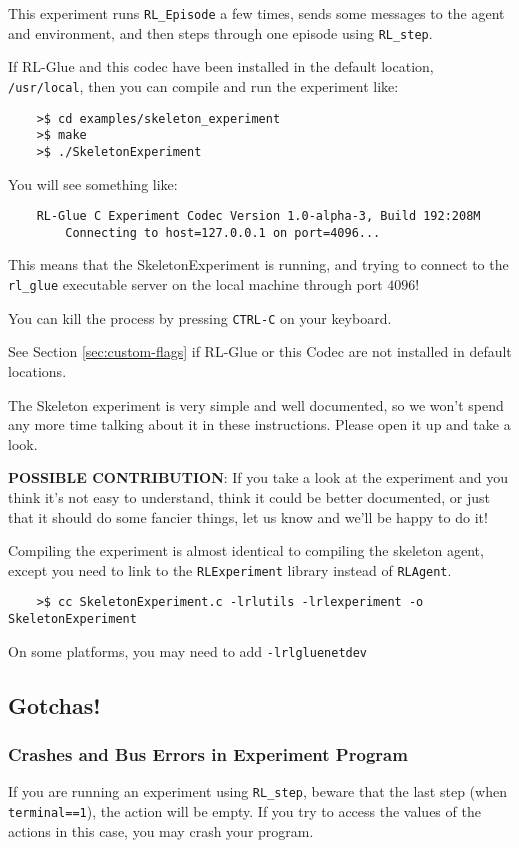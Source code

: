 \documentclass[11pt]{article}
\begin{document}
This experiment runs \texttt{RL\_Episode} a few times, sends some messages to the agent and environment, and then steps through one episode using \texttt{RL\_step}.

If RL-Glue and this codec have been installed in the default location, \texttt{/usr/local}, then you can compile and run the experiment like:
\begin{verbatim}
	>$ cd examples/skeleton_experiment
	>$ make
	>$ ./SkeletonExperiment
\end{verbatim}

You will see something like:
\begin{verbatim}
	RL-Glue C Experiment Codec Version 1.0-alpha-3, Build 192:208M
		Connecting to host=127.0.0.1 on port=4096...
\end{verbatim}

This means that the SkeletonExperiment is running, and trying to connect to the \texttt{rl\_glue} executable server on the local machine through port $4096$!  

You can kill the process by pressing \texttt{CTRL-C} on your keyboard.

See Section \ref{sec:custom-flags} if RL-Glue or this Codec are not installed in default locations.

The Skeleton experiment is very simple and well documented, so we won't spend any more time talking about it in these instructions.
Please open it up and take a look.

\textbf{POSSIBLE CONTRIBUTION}: If you take a look at the experiment and you think it's not easy to understand, think it could be better documented, 
or just that it should do some fancier things, let us know and we'll be happy to do it!

Compiling the experiment is almost identical to compiling the skeleton agent, except you need to link to the \texttt{RLExperiment} library instead of \texttt{RLAgent}.
\begin{verbatim}
	>$ cc SkeletonExperiment.c -lrlutils -lrlexperiment -o SkeletonExperiment
\end{verbatim}

On some platforms, you may need to add \texttt{-lrlgluenetdev}

\subsection{Gotchas!}
\subsubsection{Crashes and Bus Errors in Experiment Program}
If you are running an experiment using \texttt{RL\_step}, beware that the last step (when \texttt{terminal==1}), the action will be empty.  If you try to access the values of the actions in this 
case, you may crash your program.
\end{document}
